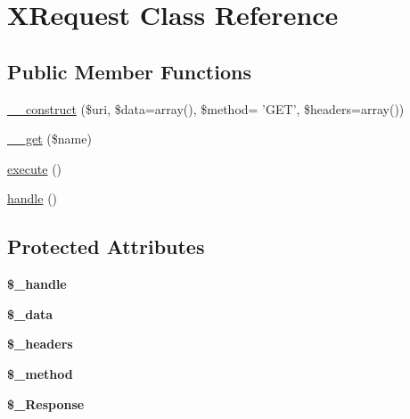 \hypertarget{classXRequest}{
\section{XRequest Class Reference}
\label{classXRequest}
}
\subsection*{Public Member Functions}
\begin{DoxyCompactItemize}
\item 
\hyperlink{classXRequest_abf5cb6cee4e104ed2a6fa9cc1659fe79}{\_\-\_\-construct} (\$uri, \$data=array(), \$method= 'GET', \$headers=array())
\item 
\hyperlink{classXRequest_a7cc9ccf8e01f3fd885029d0a04281c75}{\_\-\_\-get} (\$name)
\item 
\hyperlink{classXRequest_afff17e6f3ff03dfb594f801992074389}{execute} ()
\item 
\hyperlink{classXRequest_a0c1a9397c901f52e2cc0f79d6d3aa76b}{handle} ()
\end{DoxyCompactItemize}
\subsection*{Protected Attributes}
\begin{DoxyCompactItemize}
\item 
\hypertarget{classXRequest_a24be959a56bd280ffa08b4a7e3676d88}{
{\bfseries \$\_\-handle}}
\label{classXRequest_a24be959a56bd280ffa08b4a7e3676d88}

\item 
\hypertarget{classXRequest_a5aca604d767ee86e5c66f6b15f71ace9}{
{\bfseries \$\_\-data}}
\label{classXRequest_a5aca604d767ee86e5c66f6b15f71ace9}

\item 
\hypertarget{classXRequest_a549e72fc8aa404e33c671d0bda3bd4e1}{
{\bfseries \$\_\-headers}}
\label{classXRequest_a549e72fc8aa404e33c671d0bda3bd4e1}

\item 
\hypertarget{classXRequest_af1c7a52b0b4b8a1a8d3dd91951cc9020}{
{\bfseries \$\_\-method}}
\label{classXRequest_af1c7a52b0b4b8a1a8d3dd91951cc9020}

\item 
\hypertarget{classXRequest_a936fb5c46a0975b29428a7b1df3d05a5}{
{\bfseries \$\_\-Response}}
\label{classXRequest_a936fb5c46a0975b29428a7b1df3d05a5}

\end{DoxyCompactItemize}


